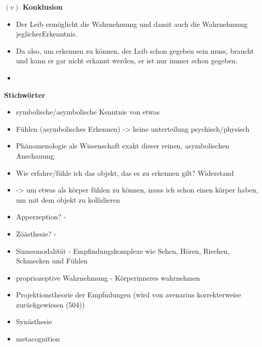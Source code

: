 \documentclass[a4paper, 12pt]{article}
\begin{document}
\begin{onehalfspace}
\vspace{5mm}
\noindent\textbf{$(v)$ Konklusion}

\begin{itemize}
  \item Der Leib ermöglicht die Wahrnehmung und damit auch die Wahrnehmung jeglicherErkenntnis.
  \item Da also, um erkennen zu können, der Leib schon gegeben sein muss, braucht und kann er gar nicht erkannt werden, er ist nur immer schon gegeben.
  \item 
\end{itemize}


\vspace{5mm}
\noindent\textbf{Stichwörter}
\begin{itemize}
  \item symbolische/asymbolische Kenntnis von etwas
  \item Fühlen (asymbolisches Erkennen) -> keine unterteilung psychisch/physisch
  \item Phänomenologie als Wissenschaft exakt dieser reinen, asymbolischen Anschauung
  \item Wie erfahre/fühle ich das objekt, das es zu erkennen gilt? Widerstand
  \item -> um etwas als körper fühlen zu können, muss ich schon einen körper haben, um mit dem objekt zu kollidieren 
  \item Apperzeption? - 
  \item Zöästhesie? - 
  \item Sinnesmodalität - Empfindungskomplexe wie Sehen, Hören, Riechen, Schmecken und Fühlen
  \item propriozeptive Wahrnehmung - Körperinneres wahrnehmen
  \item Projektionstheorie der Empfndungen (wird von avenarius korrekterweise zurückgewiesen (504))
  \item Synästhesie
  \item metacognition
\end{itemize}






\end{onehalfspace}
\end{document}
